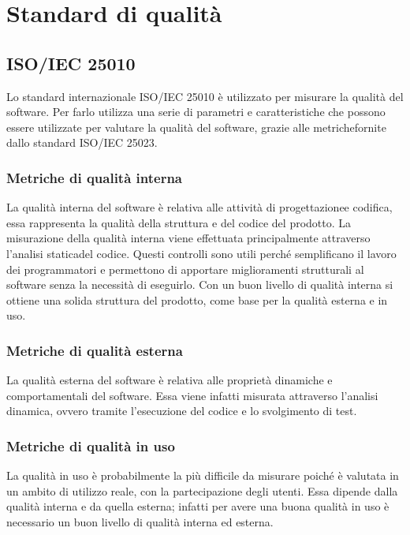 \appendix
\section{Standard di qualità}
	\subsection{ISO/IEC 25010}
		Lo standard internazionale ISO/IEC 25010 è utilizzato per misurare la qualità del software.
		Per farlo utilizza una serie di parametri e caratteristiche che possono essere utilizzate per valutare la qualità del software, grazie alle metriche\glosp fornite dallo standard ISO/IEC 25023.
		\subsubsection{Metriche di qualità interna}
			La qualità interna del software è relativa alle attività di progettazione\glosp e codifica, essa rappresenta la qualità della struttura e del codice del prodotto\glo.
			La misurazione della qualità interna viene effettuata principalmente attraverso l'analisi statica\glosp del codice.
			Questi controlli sono utili perché semplificano il lavoro dei programmatori e permettono di apportare miglioramenti strutturali al software senza la necessità di eseguirlo.
			Con un buon livello di qualità interna si ottiene una solida struttura del prodotto\glo, come base per la qualità esterna e in uso.
		\subsubsection{Metriche di qualità esterna}
			La qualità esterna del software è relativa alle proprietà dinamiche e comportamentali del software. Essa viene infatti misurata attraverso l'analisi dinamica, ovvero tramite l'esecuzione del codice e lo svolgimento di test.
		\subsubsection{Metriche di qualità in uso}
			La qualità in uso è probabilmente la più difficile da misurare poiché è valutata in un ambito di utilizzo reale, con la partecipazione degli utenti.
			Essa dipende dalla qualità interna e da quella esterna; infatti per avere una buona qualità in uso è necessario un buon livello di qualità interna ed esterna.
